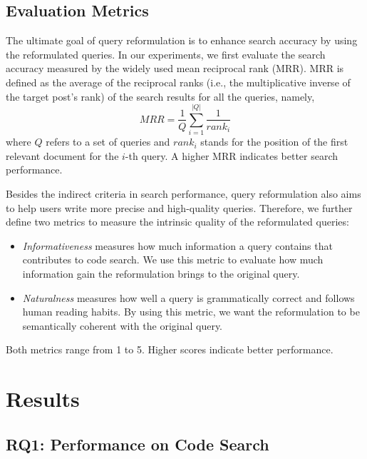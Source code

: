 \documentclass[sigconf,screen]{acmart}
\newcommand{\ie}{\hbox{i.e.}\xspace}
\begin{document}
\subsection{Evaluation Metrics}
The ultimate goal of query reformulation is to enhance search accuracy by using the reformulated queries. In our experiments, we first evaluate the search accuracy measured by the widely used mean reciprocal rank (MRR). MRR is defined as the average of the reciprocal ranks (\ie, the multiplicative inverse of the target post’s rank) of the search results for all the queries, namely,
\begin{equation}
MRR=\frac{1}{Q} \sum_{i=1}^{|Q|} \frac{1}{rank_{i}}
\end{equation}
where $Q$ refers to a set of queries and  $rank_{i}$ stands for the position of the first relevant document for the $i$-th query. A higher MRR indicates better search performance. 

Besides the indirect criteria in search performance, query reformulation also aims to help users write more precise and high-quality queries. Therefore, we further define two metrics to measure the intrinsic quality of the reformulated queries:
\begin{itemize}
\item \textit{Informativeness} measures how much information a query contains that contributes to code search. We use this metric to evaluate how much information gain the reformulation brings to the original query.
\item \textit{Naturalness} measures how well a query is grammatically correct and follows human reading habits. By using this metric, we want the reformulation to be semantically coherent with the original query.
\end{itemize}

Both metrics range from 1 to 5. Higher scores indicate better performance.

\section{Results}

\subsection{RQ1: Performance on Code Search}
\end{document}
